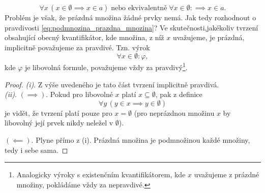 \begin{equation}\label{eq:podmnozina_prazdna_mnozina}
    \forall x\,(x\in\emptyset \implies x\in a)\;\text{nebo ekvivalentně}\;\forall x\in\emptyset:\implies x\in a.
\end{equation}
Problém je však, že prázdná množina žádné prvky nemá. Jak tedy rozhodnout o pravdivosti \eqref{eq:podmnozina_prazdna_mnozina}? Ve skutečnosti,jakékoliv tvrzení obsahující obecný kvantifikátor, kde množina, z níž $x$ uvažujeme, je prázdná, implicitně považujeme za pravdivé. Tzn. výrok
\begin{equation*}
    \forall x\in\emptyset: \varphi,
\end{equation*}
kde $\varphi$ je libovolná formule, považujeme vždy za pravdivý\footnote{Analogicky výroky s existenčním kvantifikátorem, kde $x$ uvažujeme z prázdné množiny, pokládáme vždy za nepravdivé.}.
\begin{proof}
    \textit{(i)}. Z výše uvedeného je tato část tvrzení implicitně pravdivá.\\
    \textit{(ii)}. \textit{$(\implies)$}. Pokud pro libovolné $x$ platí $x\subseteq\emptyset$, pak z definice
    \begin{equation*}
        \forall y\,(y\in x \implies y\in\emptyset)
    \end{equation*}
    je vidět, že tvrzení platí pouze pro $x=\emptyset$ (pro neprázdnou množinu $x$ by libovolný její prvek nikdy neležel v $\emptyset$).\par
    \textit{$(\impliedby)$}. Plyne přímo z (i). Prázdná množina je podmnožinou každé množiny, tedy i sebe sama.
\end{proof}

